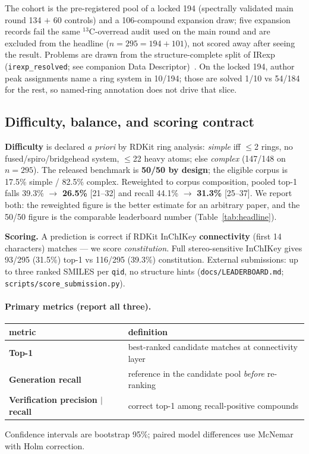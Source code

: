\documentclass{article}
\begin{document}
The cohort is the pre-registered pool of a locked 194 (spectrally validated main round 134 $+$
60 controls) and a 106-compound expansion draw; five expansion records fail the same
$^{13}$C-overread audit used on the main round and are excluded from the headline
($n{=}295{=}194{+}101$), not scored away after seeing the result.
Problems are drawn from the structure-complete split of IRexp (\texttt{irexp\_resolved}; see
companion Data Descriptor)~\citep{yabbarov2026irexp}.
On the locked 194, author peak assignments name a ring system in 10/194; those are solved
1/10 vs 54/184 for the rest, so named-ring annotation does not drive that slice.

\subsection{Difficulty, balance, and scoring contract}

\textbf{Difficulty} is declared \emph{a priori} by RDKit ring analysis: \emph{simple} iff
$\leq$2 rings, no fused/spiro/bridgehead system, $\leq$22 heavy atoms; else \emph{complex}
(147/148 on $n{=}295$).
The released benchmark is \textbf{50/50 by design}; the eligible corpus is 17.5\% simple /
82.5\% complex.
Reweighted to corpus composition, pooled top-1 falls 39.3\% $\to$ \textbf{26.5\%} [21--32]
and recall 44.1\% $\to$ \textbf{31.3\%} [25--37].
We report both: the reweighted figure is the better estimate for an arbitrary paper, and the
50/50 figure is the comparable leaderboard number (Table~\ref{tab:headline}).

\textbf{Scoring.} A prediction is correct if RDKit InChIKey \textbf{connectivity} (first 14
characters) matches --- we score \emph{constitution}.
Full stereo-sensitive InChIKey gives 93/295 (31.5\%) top-1 vs 116/295 (39.3\%) constitution.
External submissions: up to three ranked SMILES per \texttt{qid}, no structure hints
(\texttt{docs/LEADERBOARD.md}; \texttt{scripts/score\_submission.py}).

\paragraph{Primary metrics (report all three).}
\begin{center}
\begin{tabular}{@{}lp{7.2cm}@{}}
\toprule
metric & definition \\
\midrule
\textbf{Top-1} & best-ranked candidate matches at connectivity layer \\
\textbf{Generation recall} & reference in the candidate pool \emph{before} re-ranking \\
\textbf{Verification precision $|$ recall} & correct top-1 among recall-positive compounds \\
\bottomrule
\end{tabular}
\end{center}
Confidence intervals are bootstrap 95\%; paired model differences use McNemar with Holm correction.
\end{document}
